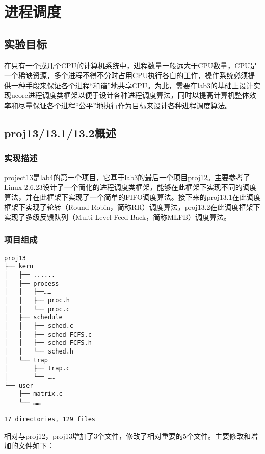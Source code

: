 \section{进程调度}\label{ux8fdbux7a0bux8c03ux5ea6}

\subsection{实验目标}\label{ux5b9eux9a8cux76eeux6807}

在只有一个或几个CPU的计算机系统中，进程数量一般远大于CPU数量，CPU是一个稀缺资源，多个进程不得不分时占用CPU执行各自的工作，操作系统必须提供一种手段来保证各个进程``和谐''地共享CPU。为此，需要在lab3的基础上设计实现ucore进程调度类框架以便于设计各种进程调度算法，同时以提高计算机整体效率和尽量保证各个进程``公平''地执行作为目标来设计各种进程调度算法。

\subsection{proj13/13.1/13.2概述}\label{proj1313.113.2ux6982ux8ff0}

\subsubsection{实现描述}\label{ux5b9eux73b0ux63cfux8ff0}

project13是lab4的第一个项目，它基于lab3的最后一个项目proj12。主要参考了Linux-2.6.23设计了一个简化的进程调度类框架，能够在此框架下实现不同的调度算法，并在此框架下实现了一个简单的FIFO调度算法。接下来的proj13.1在此调度框架下实现了轮转（Round
Robin，简称RR）调度算法，proj13.2在此调度框架下实现了多级反馈队列（Multi-Level
Feed Back，简称MLFB）调度算法。

\subsubsection{项目组成}\label{ux9879ux76eeux7ec4ux6210}

\begin{lstlisting}
proj13
├── kern
│   ├── ......
│   ├── process
│   │   ├──……
│   │   ├── proc.h
│   │   └── proc.c
│   ├── schedule
│   │   ├── sched.c
│   │   ├── sched_FCFS.c
│   │   ├── sched_FCFS.h
│   │   └── sched.h
│   └── trap
│       ├── trap.c
│       └── ……
└── user
    ├── matrix.c
    └── ……

17 directories, 129 files
\end{lstlisting}

相对与proj12，proj13增加了3个文件，修改了相对重要的5个文件。主要修改和增加的文件如下：

